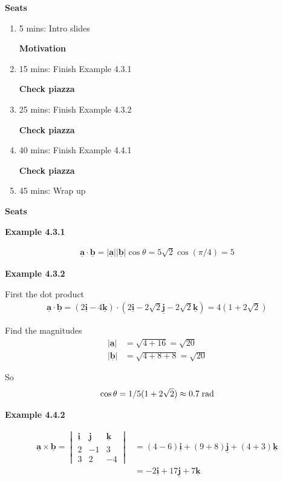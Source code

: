 \textbf{Seats}
\begin{enumerate}
    \item 5 mins: Intro slides \par
    \textbf{Motivation}
    \item 15 mins: Finish Example 4.3.1 \par
    \textbf{Check piazza}
    \item 25 mins: Finish Example 4.3.2 \par
    \textbf{Check piazza}
    \item 40 mins: Finish Example 4.4.1 \par
    \textbf{Check piazza}
    \item 45 mins: Wrap up \par
\end{enumerate}
\textbf{Seats}

\newcommand{\vect}[1]{\underline{\mathbf{#1}}}

\vspace{5mm} 
\textbf{Example 4.3.1} \par

\begin{align*}
\vect{a}\cdot\vect{b} = |\vect{a}||\vect{b}|\cos\theta = 5\sqrt{2}\cos(\pi/4)=5
\end{align*}

\vspace{5mm} 
\textbf{Example 4.3.2} \par

First the dot product
\begin{align*}
\vect{a}\cdot\vect{b} = (2\vect{i}-4\vect{k})\cdot(2\vect{i}-2\sqrt{2}\vect{j}-2\sqrt{2}\vect{k}) = 4(1 + 2\sqrt{2})
\end{align*}

Find the magnitudes
\begin{align*}
|\vect{a}| &= \sqrt{4+16} = \sqrt{20}\\
|\vect{b}| &= \sqrt{4 + 8 + 8} = \sqrt{20}
\end{align*}

So
\begin{align*}
    \cos \theta = 1/5(1 + 2\sqrt{2}) \approx 0.7 \; {\rm rad}
\end{align*}

\vspace{5mm} 
\textbf{Example 4.4.2} \par

\begin{align*}
\vect{a}\times\vect{b} = \begin{vmatrix}
    \vect{i} & \vect{j} & \vect{k}\\
    2 & -1 & 3\\
    3 & 2 & -4
\end{vmatrix} &= (4-6)\vect{i} + (9+8)\vect{j} + (4+3)\vect{k} \\
&= -2\vect{i} + 17\vect{j} + 7\vect{k}
\end{align*}

